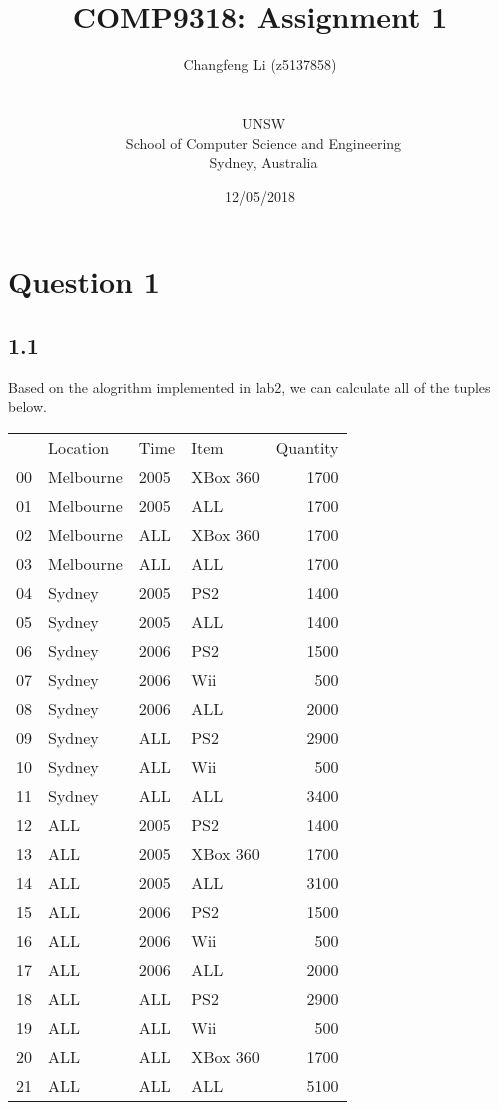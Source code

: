 \documentclass[a4paper,12pt]{article}
\title{COMP9318: Assignment 1}
\author{Changfeng Li (z5137858)\\
\date{12/05/2018}\\
\ UNSW\\
\ School of Computer Science and Engineering\\[-0.3ex]
\ Sydney, Australia\\
}
\begin{document}
\maketitle


\newpage

\section*{Question 1}

\subsection*{1.1}
\setlength{\parindent}{0pt} %

Based on the alogrithm implemented in lab2, we can calculate all of the tuples below.

\begin{tabular}{llllr}
{} &   Location &  Time &      Item &  Quantity \\
00 &  Melbourne &  2005 &  XBox 360 &    1700 \\
01 &  Melbourne &  2005 &       ALL &    1700 \\
02 &  Melbourne &   ALL &  XBox 360 &    1700 \\
03 &  Melbourne &   ALL &       ALL &    1700 \\
04 &     Sydney &  2005 &       PS2 &    1400 \\
05 &     Sydney &  2005 &       ALL &    1400 \\
06 &     Sydney &  2006 &       PS2 &    1500 \\
07 &     Sydney &  2006 &       Wii &     500 \\
08 &     Sydney &  2006 &       ALL &    2000 \\
09 &     Sydney &   ALL &       PS2 &    2900 \\
10 &     Sydney &   ALL &       Wii &     500 \\
11 &     Sydney &   ALL &       ALL &    3400 \\
12 &        ALL &  2005 &       PS2 &    1400 \\
13 &        ALL &  2005 &  XBox 360 &    1700 \\
14 &        ALL &  2005 &       ALL &    3100 \\
15 &        ALL &  2006 &       PS2 &    1500 \\
16 &        ALL &  2006 &       Wii &     500 \\
17 &        ALL &  2006 &       ALL &    2000 \\
18 &        ALL &   ALL &       PS2 &    2900 \\
19 &        ALL &   ALL &       Wii &     500 \\
20 &        ALL &   ALL &  XBox 360 &    1700 \\
21 &        ALL &   ALL &       ALL &    5100 \\
\end{tabular}
\end{document}
